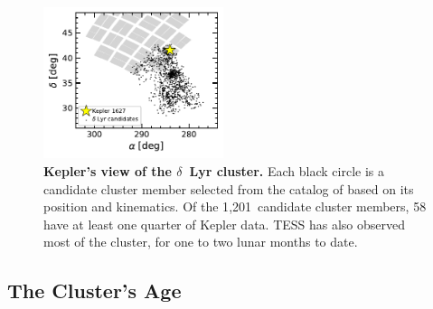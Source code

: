 \documentclass[12pt,modern,twocolumn,tighten]{aastex63}
\newcommand{\nkinematic}{1{,}201} %
\begin{document}
\begin{figure}[t]
	\begin{center}
		\leavevmode
		\includegraphics[width=0.47\textwidth]{f2.pdf}
	\end{center}
	\vspace{-0.7cm}
	\caption{
    {\bf Kepler's view of the $\delta$~Lyr cluster.} Each black circle
    is a candidate cluster member selected from the catalog of
    \citet{KounkelCovey2019} based on its position and kinematics.  Of
    the \nkinematic\ candidate cluster members, 58 have at least one
    quarter of Kepler data.  TESS has also observed most of the
    cluster, for one to two lunar months to date.
		\label{fig:skychart}
	}
\end{figure}


\subsection{The Cluster's Age}
\label{sec:clusterage}
\end{document}
